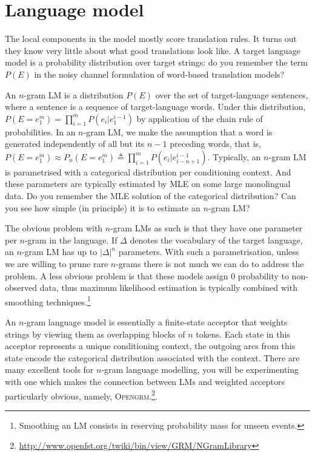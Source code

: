 
\section{Language model}

The local components in the model mostly score translation rules.
It turns out they know very little about what good translations look like.
A target language model is a probability distribution over target strings: do you remember the term $P(E)$ in the noisy channel formulation of word-based translation models?


An $n$-gram LM is a distribution $P(E)$ over the set of target-language sentences, where a sentence is a sequence of target-language words.
Under this distribution,  $P(E=e_1^m) = \prod_{i=1}^m P(e_i|e_1^{i-1})$  by application of the chain rule of probabilities. 
In an $n$-gram LM, we make the assumption that a word is generated independently of all but its $n-1$ preceding words, that is, $P(E=e_1^m) \approx P_n(E=e_1^m) \triangleq \prod_{i=1}^m P(e_i|e_{i-n+1}^{i-1})$.
Typically, an $n$-gram LM is parametrised with a categorical distribution per conditioning context.
And these parameters are typically estimated by MLE on some large monolingual data. Do you remember the MLE solution of the categorical distribution? Can you see how simple (in principle) it is to estimate an $n$-gram LM?

The obvious problem with $n$-gram LMs as such is that they have one parameter per $n$-gram in the language.
If $\Delta$ denotes the vocabulary of the target language, an $n$-gram LM has up to $|\Delta|^n$ parameters.
With such a parametrisation, unless we are willing to prune rare $n$-grams there is not much we can do to address the problem.
A less obvious problem is that these models assign 0 probability to non-observed data, thus maximum likelihood estimation is typically combined with smoothing techniques.\footnote{Smoothing an LM consists in reserving probability mass for unseen events.}

An $n$-gram language model is essentially a finite-state acceptor that weights strings by viewing them as overlapping blocks of $n$ tokens. 
Each state in this acceptor represents a unique conditioning context, the outgoing arcs from this state encode the categorical distribution associated with the context.
There are many excellent tools for $n$-gram language modelling, you will be experimenting with one which makes the connection between LMs and weighted acceptors particularly obvious, namely, \textsc{Opengrm}.\footnote{\url{http://www.openfst.org/twiki/bin/view/GRM/NGramLibrary}}.

